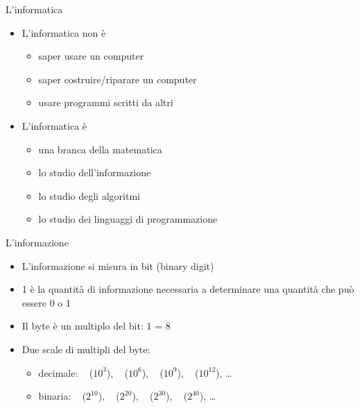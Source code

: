 

\begin{frame}{L'informatica}
  \vfill
  \begin{itemize}
    \item L'informatica \alert{non} è
    \begin{itemize}
      \item saper usare un computer
      \item saper costruire/riparare un computer
      \item usare programmi scritti da altri
    \end{itemize}
    \vfill
    \item L'informatica è
    \begin{itemize}
      \item una branca della matematica
      \item lo studio dell'\alert{informazione}
      \item lo studio degli \alert{algoritmi}
      \item lo studio dei \alert{linguaggi di programmazione}
    \end{itemize}
  \end{itemize}
  \vfill
\end{frame}

\begin{frame}{L'informazione}
  \vfill
  \begin{itemize}
    \item L'informazione si misura in \alert{bit} (\alert{bi}nary digi\alert{t})
    \vfill
    \item \SI{1}{\bit} è la quantità di informazione necessaria a determinare una
    quantità che può essere \alert{0} o \alert{1}
    \vfill
    \item Il \alert{byte} è un multiplo del bit: \SI{1}{\byte} = \SI{8}{\bit}
    \vfill
    \item Due scale di multipli del byte:
    \begin{itemize}
      \item decimale: \si{\kilo\byte} (\(10^3\)), \si{\mega\byte} (\(10^6\)), \si{\giga\byte} (\(10^9\)), \si{\tera\byte} (\(10^{12}\)), \dots
      \item \alert{binaria}: \si{\kibi\byte} (\(2^{10}\)), \si{\mebi\byte} (\(2^{20}\)), \si{\gibi\byte} (\(2^{30}\)), \si{\tebi\byte} (\(2^{40}\)), \dots
    \end{itemize}
  \end{itemize}
  \vfill
\end{frame}

